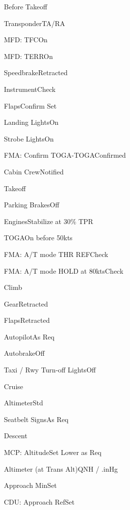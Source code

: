\documentclass[sim-use]{checklist}
\begin{document}
\begin{checklist}{Before Takeoff}
  \item{Transponder}{TA/RA}
  \item{MFD: TFC}{On}
  \item{MFD: TERR}{On}
  \item{Speedbrake}{Retracted}
  \item{Instrument}{Check}
  \item{Flaps}{Confirm Set}
  \item{Landing Lights}{On}
  \item{Strobe Lights}{On}
  \item{FMA: Confirm TOGA-TOGA}{Confirmed}
  \item{Cabin Crew}{Notified}
\end{checklist}

\begin{checklist}{Takeoff}
  \item{Parking Brakes}{Off}
  \item{Engines}{Stabilize at 30\% TPR}
  \item{TOGA}{On before 50kts}
  \item{FMA: A/T mode THR REF}{Check}
  \item{FMA: A/T mode HOLD at 80kts}{Check}
\end{checklist}

\begin{checklist}{Climb}
  \item{Gear}{Retracted}
  \item{Flaps}{Retracted}
  \item{Autopilot}{As Req}
  \item{Autobrake}{Off}
  \item{Taxi / Rwy Turn-off Lights}{Off}
\end{checklist}

\begin{checklist}{Cruise}
  \item{Altimeter}{Std}
  \item{Seatbelt Signs}{As Req}
\end{checklist}

\begin{checklist}{Descent}
  \item{MCP: Altitude}{Set Lower as Req}
  \item{Altimeter (at Trans Alt)}{\blank QNH / \blank.\blank inHg}
  \item{Approach Min}{Set}
  \item{CDU: Approach Ref}{Set}
\end{checklist}
\end{document}
